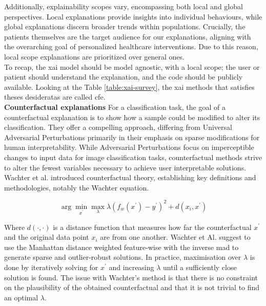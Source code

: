 Additionally, explainability scopes vary, encompassing both local and global perspectives.
Local explanations provide insights into individual behaviours, while global explanations discern broader trends within populations. Crucially, the patients themselves are the target audience for our explanations, aligning with the overarching goal of personalized healthcare interventions. Due to this reason, local scope explanations are prioritized over general ones. \\



To recap, the \acrshort{xai} model should be model agnostic, with a local scope; the user or patient should understand the explanation, and the code should be publicly available.
Looking at the Table \ref{table:xai-survey}, the \acrshort{xai} methods that satisfies theses desideratas are called \acrfull{cfe}.\\

\textbf{Counterfactual explanations} For a classification task, the goal of a counterfactual explanation is to show how a sample could be modified to alter its classification. They offer a compelling approach, differing from Universal Adversarial Perturbations \cite{moosavi_dezfooli_universal_2017} primarily in their emphasis on sparse modifications for human interpretability.
While Adversarial Perturbations focus on imperceptible changes to input data for image classification tasks, counterfactual methods strive to alter the fewest variables necessary to achieve user interpretable solutions. \\


Wachter et al. \cite{wachter_counterfactual_2018} introduced counterfactual theory, establishing key definitions and methodologies, notably the Wachter equation. 

\begin{equation} \label{eq:2}
\arg \min _{x^{\prime}} \max _{\lambda} \lambda\left(f_{w}\left(x^{\prime}\right)-y^{\prime}\right)^{2}+d\left(x_{i}, x^{\prime}\right)
\end{equation}

Where $d(\cdot, \cdot)$ is a distance function that measures how far the counterfactual $x^{\prime}$ and the original data point $x_{i}$ are from one another. Wachter et Al. \cite{wachter_counterfactual_2018} suggest to use the Manhattan distance weighted feature-wise with the inverse \acrfull{mad} to generate sparse and outlier-robust solutions.
In practice, maximisation over $\lambda$ is done by iteratively solving for $x^{\prime}$ and increasing $\lambda$ until a sufficiently close solution is found. The issue with Wachter's method is that there is no constraint on the plausibility of the obtained counterfactual and that it is not trivial to find an optimal $\lambda$. \\

